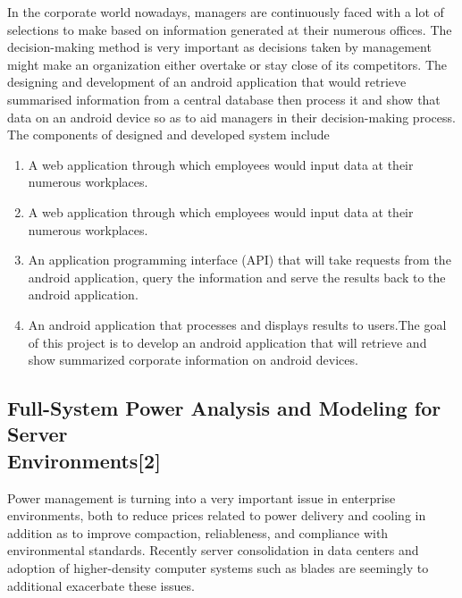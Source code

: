 \documentclass[12pt, a4paper]{article}
\begin{document}
\vspace{5mm}   
In the corporate world nowadays, managers are continuously faced with a lot of selections to
make based on information generated at their numerous offices. The decision-making method is
very important as decisions taken by management might make an organization either overtake or
stay close of its competitors. The designing  and development of an android application that would retrieve summarised information from a central database then  process it  and show
that data on an android device so as to aid managers in their decision-making process.
 \\
 The components of designed and developed system include
 \\
    
\begin{enumerate}
\item A web application through which employees would input data at their numerous workplaces.
\item A web application through which employees would input data at their numerous workplaces.
\item An application programming interface (API) that will take requests from the android application, query the information and serve the results back to the android application.
\item An android application that processes and displays results to users.The goal of this project is to develop an android application that will retrieve and show summarized corporate information on android devices.\\
\end{enumerate}
\vspace{5mm}
\subsection{Full-System Power Analysis and Modeling for Server\\ Environments[2]}

\vspace{5mm}
Power management is turning into a very important issue in enterprise environments, both to reduce prices related to power delivery and cooling in addition as to improve compaction, reliableness, and compliance with environmental standards. Recently server consolidation in data centers and adoption of higher-density computer systems such as blades are seemingly to additional exacerbate these issues.\\
\end{document}
